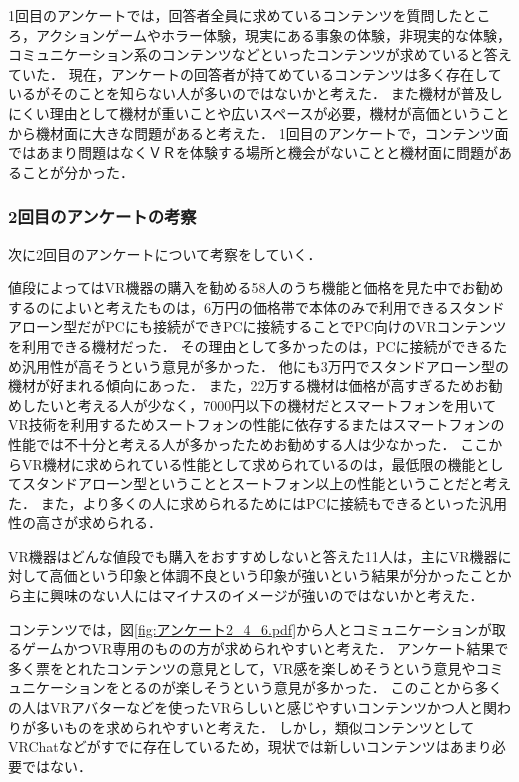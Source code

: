 \documentclass[12pt,a4j]{ltjsarticle}
\begin{document}
1回目のアンケートでは，回答者全員に求めているコンテンツを質問したところ，アクションゲームやホラー体験，現実にある事象の体験，非現実的な体験，コミュニケーション系のコンテンツなどといったコンテンツが求めていると答えていた．
現在，アンケートの回答者が持てめているコンテンツは多く存在しているがそのことを知らない人が多いのではないかと考えた．
また機材が普及しにくい理由として機材が重いことや広いスペースが必要，機材が高価ということから機材面に大きな問題があると考えた．
1回目のアンケートで，コンテンツ面ではあまり問題はなくＶＲを体験する場所と機会がないことと機材面に問題があることが分かった．

\subsubsection{2回目のアンケートの考察}
次に2回目のアンケートについて考察をしていく．

値段によってはVR機器の購入を勧める58人のうち機能と価格を見た中でお勧めするのによいと考えたものは，6万円の価格帯で本体のみで利用できるスタンドアローン型だがPCにも接続ができPCに接続することでPC向けのVRコンテンツを利用できる機材だった．
その理由として多かったのは，PCに接続ができるため汎用性が高そうという意見が多かった．
他にも3万円でスタンドアローン型の機材が好まれる傾向にあった．
また，22万する機材は価格が高すぎるためお勧めしたいと考える人が少なく，7000円以下の機材だとスマートフォンを用いてVR技術を利用するためスートフォンの性能に依存するまたはスマートフォンの性能では不十分と考える人が多かったためお勧めする人は少なかった．
ここからVR機材に求められている性能として求められているのは，最低限の機能としてスタンドアローン型ということとスートフォン以上の性能ということだと考えた．
また，より多くの人に求められるためにはPCに接続もできるといった汎用性の高さが求められる．

VR機器はどんな値段でも購入をおすすめしないと答えた11人は，主にVR機器に対して高価という印象と体調不良という印象が強いという結果が分かったことから主に興味のない人にはマイナスのイメージが強いのではないかと考えた．

コンテンツでは，図\ref{fig:アンケート2_4_6.pdf}から人とコミュニケーションが取るゲームかつVR専用のものの方が求められやすいと考えた．
アンケート結果で多く票をとれたコンテンツの意見として，VR感を楽しめそうという意見やコミュニケーションをとるのが楽しそうという意見が多かった．
このことから多くの人はVRアバターなどを使ったVRらしいと感じやすいコンテンツかつ人と関わりが多いものを求められやすいと考えた．
しかし，類似コンテンツとしてVRChatなどがすでに存在しているため，現状では新しいコンテンツはあまり必要ではない．
\end{document}
